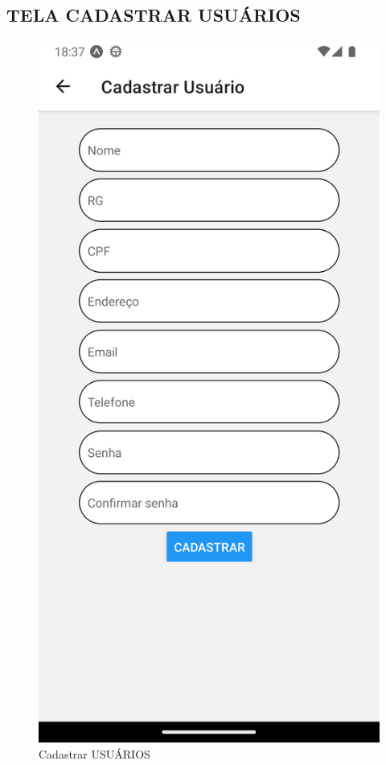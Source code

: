 \subsection{TELA CADASTRAR USUÁRIOS}
\begin{figure}[htb]
	\caption{\label{fig_diagrama-classes} Cadastrar USUÁRIOS}
	\begin{center}
	    \includegraphics[width=0.5\linewidth]{imagens/tela-cadastrar-usuario.png}
	\end{center}
\end{figure}

\newpage


